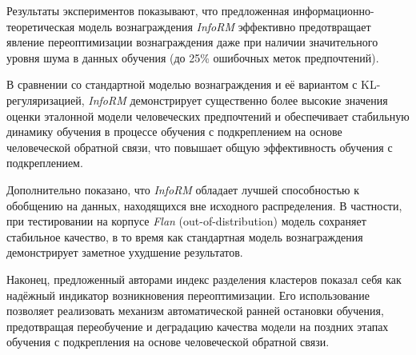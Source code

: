 Результаты экспериментов показывают, что предложенная информационно-теоретическая модель вознаграждения \emph{InfoRM} эффективно предотвращает явление переоптимизации вознаграждения даже при наличии значительного уровня шума в данных обучения (до 25\% ошибочных меток предпочтений). 


В сравнении со стандартной моделью вознаграждения и её вариантом с KL-регуляризацией, \emph{InfoRM} демонстрирует существенно более высокие значения оценки эталонной модели человеческих предпочтений и обеспечивает стабильную динамику обучения в процессе обучения с подкреплением на основе человеческой обратной связи, что повышает общую эффективность обучения с подкреплением.  

Дополнительно показано, что \emph{InfoRM} обладает лучшей способностью к обобщению на данных, находящихся вне исходного распределения. В частности, при тестировании на корпусе \emph{Flan} (out-of-distribution) модель сохраняет стабильное качество, в то время как стандартная модель вознаграждения демонстрирует заметное ухудшение результатов.  

Наконец, предложенный авторами индекс разделения кластеров показал себя как надёжный индикатор возникновения переоптимизации. Его использование позволяет реализовать механизм автоматической ранней остановки обучения, предотвращая переобучение и деградацию качества модели на поздних этапах обучения с подкрепления на основе человеческой обратной связи.
